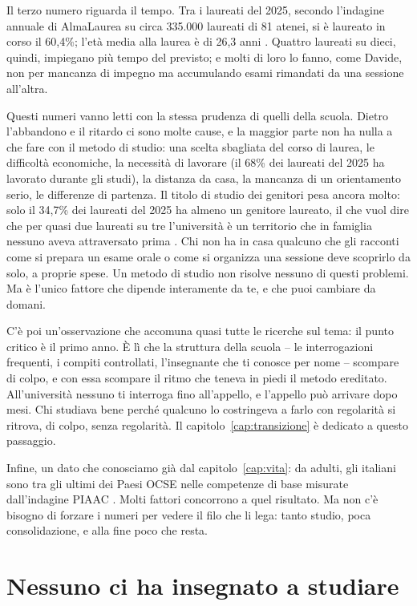 Il terzo numero riguarda il tempo. Tra i laureati del 2025, secondo
l'indagine annuale di AlmaLaurea su circa 335.000 laureati di 81 atenei,
si è laureato in corso il 60,4\%; l'età media alla laurea è di 26,3 anni
\parencite{almalaurea2026}. Quattro laureati su dieci, quindi, impiegano
più tempo del previsto; e molti di loro lo fanno, come Davide, non per
mancanza di impegno ma accumulando esami rimandati da una sessione
all'altra.

Questi numeri vanno letti con la stessa prudenza di quelli della
scuola. Dietro l'abbandono e il ritardo ci sono molte cause, e la
maggior parte non ha nulla a che fare con il metodo di studio: una
scelta sbagliata del corso di laurea, le difficoltà economiche, la
necessità di lavorare (il 68\% dei laureati del 2025 ha lavorato
durante gli studi), la distanza da casa, la mancanza di un orientamento
serio, le differenze di partenza. Il titolo di studio dei genitori pesa
ancora molto: solo il 34,7\% dei laureati del 2025 ha almeno un genitore
laureato, il che vuol dire che per quasi due laureati su tre
l'università è un territorio che in famiglia nessuno aveva attraversato
prima \parencite{almalaurea2026}. Chi non ha in casa qualcuno che gli
racconti come si prepara un esame orale o come si organizza una
sessione deve scoprirlo da solo, a proprie spese. Un metodo di studio
non risolve nessuno di questi problemi. Ma è l'unico fattore che dipende
interamente da te, e che puoi cambiare da domani.

C'è poi un'osservazione che accomuna quasi tutte le ricerche sul tema:
il punto critico è il primo anno. È lì che la struttura della scuola --
le interrogazioni frequenti, i compiti controllati, l'insegnante che ti
conosce per nome -- scompare di colpo, e con essa scompare il ritmo che
teneva in piedi il metodo ereditato. All'università nessuno ti
interroga fino all'appello, e l'appello può arrivare dopo mesi. Chi
studiava bene perché qualcuno lo costringeva a farlo con regolarità si
ritrova, di colpo, senza regolarità. Il capitolo~\ref{cap:transizione}
è dedicato a questo passaggio.

Infine, un dato che conosciamo già dal capitolo~\ref{cap:vita}: da
adulti, gli italiani sono tra gli ultimi dei Paesi OCSE nelle
competenze di base misurate dall'indagine PIAAC \parencite{oecd2024piaac}.
Molti fattori concorrono a quel risultato. Ma non c'è bisogno di
forzare i numeri per vedere il filo che li lega: tanto studio, poca
consolidazione, e alla fine poco che resta.

\section{Nessuno ci ha insegnato a studiare}

